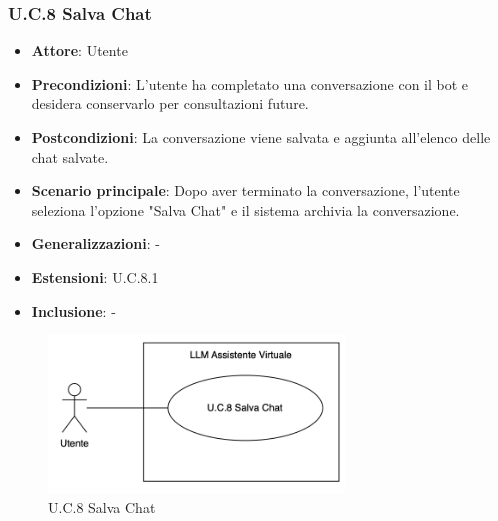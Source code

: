 \subsubsection{U.C.8 Salva Chat}
\begin{itemize}
    \item \textbf{Attore}: Utente
    \item \textbf{Precondizioni}: L'utente ha completato una conversazione con il bot e desidera conservarlo per consultazioni future. 
    \item \textbf{Postcondizioni}: La conversazione viene salvata e aggiunta all'elenco delle chat salvate.
    \item \textbf{Scenario principale}: Dopo aver terminato la conversazione, l'utente seleziona l'opzione "Salva Chat" e il sistema archivia la conversazione.
    \item \textbf{Generalizzazioni}: -
    \item \textbf{Estensioni}: U.C.8.1
    \item \textbf{Inclusione}: -
\end{itemize}
\begin{figure}[H]
    \centering
    \includegraphics[width=0.7\textwidth]{img/UC8.png}
    \caption{U.C.8 Salva Chat}
\end{figure}
\newpage

